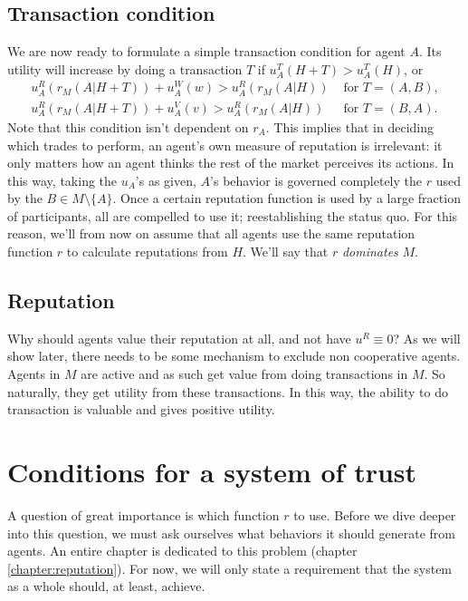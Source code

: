 \subsection{Transaction condition}
We are now ready to formulate a simple transaction condition for agent $A$. 
Its utility will increase by doing a transaction $T$ if $u^T_A(H + T) > u^T_A(H)$, 
or 
\begin{align*}
u^R_A(r_M(A|H + T)) + u^W_A(w) > u^R_A(r_M(A|H)) &\text{ for } T = (A, B),\\
u^R_A(r_M(A|H + T)) + u^V_A(v) > u^R_A(r_M(A|H)) &\text{ for } T = (B, A).
\end{align*}
Note that this condition isn't dependent on $r_A$. 
This implies that in deciding which trades to perform, 
an agent's own measure of reputation is irrelevant: 
it only matters how an agent thinks the rest of the market perceives its actions. 
In this way, taking the $u_A$'s as given, 
$A$'s behavior is governed completely the $r$ used by the $B \in M \setminus \{ A \}$. 
Once a certain reputation function is used by a large fraction of participants, 
all are compelled to use it; 
reestablishing the status quo. 
For this reason, we'll from now on assume that all agents use the same reputation function $r$ to calculate reputations from $H$. We'll say that $r$ \emph{dominates} $M$.

\subsection{Reputation}
Why should agents value their reputation at all, 
and not have $u^R \equiv 0$? 
As we will show later, 
there needs to be some mechanism to exclude non cooperative agents. 
Agents in $M$ are active and as such get value from doing transactions in $M$. 
So naturally, they get utility from these transactions. 
In this way, the ability to do transaction is valuable and gives positive utility.

\section{Conditions for a system of trust}
A question of great importance is which function $r$ to use. 
Before we dive deeper into this question, 
we must ask ourselves what behaviors it should generate from agents. 
An entire chapter is dedicated to this problem (chapter \ref{chapter:reputation}). 
For now, we will only state a requirement that the system as a whole should, at least, achieve.

